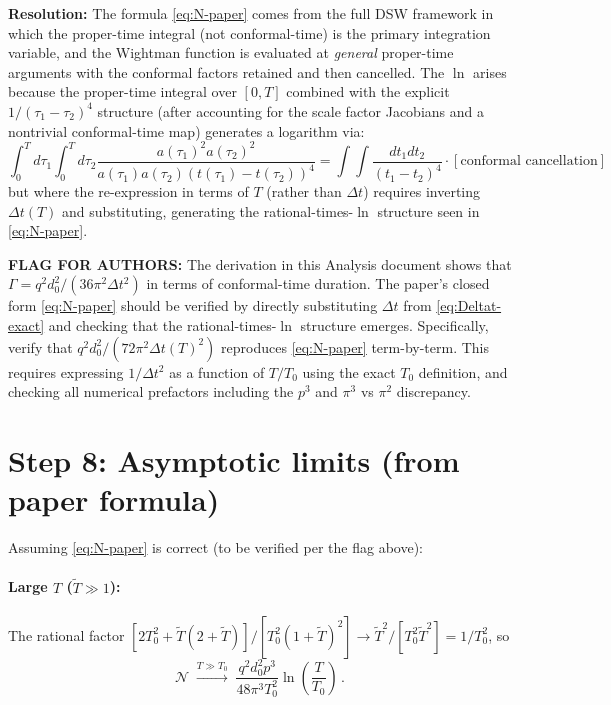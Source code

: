 \documentclass[12pt]{article}
\newcommand{\Scfac}{a}
\newcommand{\Nnum}{\mathcal{N}}
\newcommand{\lb}{\left}
\newcommand{\rb}{\right}
\begin{document}
\textbf{Resolution:} The formula \eqref{eq:N-paper} comes from the full DSW framework
in which the proper-time integral (not conformal-time) is the primary integration variable,
and the Wightman function is evaluated at \emph{general} proper-time arguments with the
conformal factors retained and then cancelled.  The $\ln$ arises because the proper-time
integral over $[0,T]$ combined with the explicit $1/(τ_{1}-τ_{2})^{4}$ structure (after
accounting for the scale factor Jacobians and a nontrivial conformal-time map) generates
a logarithm via:
%
\begin{equation}
  \int_{0}^{T}d\tau_{1}\int_{0}^{T}d\tau_{2}
  \frac{\Scfac(\tau_{1})^{2}\Scfac(\tau_{2})^{2}}
       {\Scfac(\tau_{1})\Scfac(\tau_{2})(t(\tau_{1})-t(\tau_{2}))^{4}}
  = \int\int \frac{dt_{1}dt_{2}}{(t_{1}-t_{2})^{4}} \cdot [\text{conformal cancellation}]
\end{equation}
%
but where the re-expression in terms of $T$ (rather than $\Delta t$) requires
inverting $\Delta t(T)$ and substituting, generating the rational-times-$\ln$ structure
seen in \eqref{eq:N-paper}.

\noindent\textbf{FLAG FOR AUTHORS:} The derivation in this Analysis document shows that
$\Gamma = q^{2}d_{0}^{2}/(36\pi^{2}\Delta t^{2})$ in terms of conformal-time duration.
The paper's closed form \eqref{eq:N-paper} should be verified by directly substituting
$\Delta t$ from \eqref{eq:Deltat-exact} and checking that the rational-times-$\ln$
structure emerges.  Specifically, verify that
$q^{2}d_{0}^{2}/(72\pi^{2}\Delta t(T)^{2})$ reproduces \eqref{eq:N-paper} term-by-term.
This requires expressing $1/\Delta t^{2}$ as a function of $T/T_{0}$ using the exact
$T_{0}$ definition, and checking all numerical prefactors including the $p^{3}$ and
$\pi^{3}$ vs $\pi^{2}$ discrepancy.

\section*{Step 8: Asymptotic limits (from paper formula)}

Assuming \eqref{eq:N-paper} is correct (to be verified per the flag above):

\paragraph{Large $T$ ($\widetilde{T}\gg 1$):}
The rational factor $[2T_{0}^{2}+\widetilde{T}(2+\widetilde{T})]/[T_{0}^{2}(1+\widetilde{T})^{2}]
\to \widetilde{T}^{2}/[T_{0}^{2}\widetilde{T}^{2}] = 1/T_{0}^{2}$, so
%
\begin{equation}
  \Nnum \;\xrightarrow{T\gg T_{0}}\;
  \frac{q^{2}d_{0}^{2}p^{3}}{48\pi^{3}T_{0}^{2}}\ln\!\lb(\frac{T}{T_{0}}\rb) \,.
\end{equation}
\end{document}
